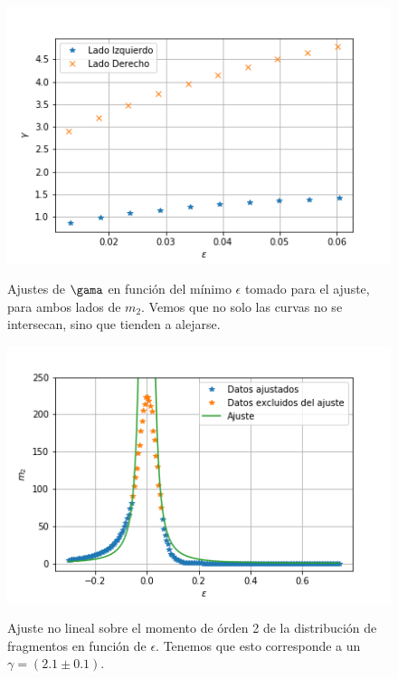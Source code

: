 \documentclass[
 reprint,
 amsmath,amssymb,
 aps,
]{revtex4-1}
\begin{document}
\begin{figure}[ht]
\begin{center}
\includegraphics[scale=0.62]{../images/gamma_vs_epsilon.png} \\
\caption{Ajustes de $\gama$ en funci\'on del m\'inimo $\epsilon$ tomado para el ajuste, para ambos lados de $m_2$. Vemos que no solo las curvas no se intersecan, sino que tienden a alejarse.}\label{gamma_vs_epsilon}
\end{center}
\end{figure}

\begin{figure}[ht]
\begin{center}
\includegraphics[scale=0.62]{../images/m_2_vs_epsilon_ajuste.png} \\
\caption{Ajuste no lineal sobre el momento de \'orden 2 de la distribuci\'on de fragmentos en funci\'on de $\epsilon$. Tenemos que esto corresponde a un $\gamma = (2.1 \pm 0.1)$.}\label{m_2_vs_epsilon_ajuste}
\end{center}
\end{figure}
\end{document}
